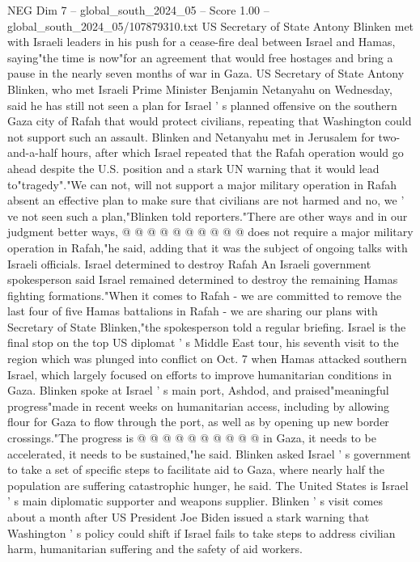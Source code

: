 \begin{textsample}{NEG Dim 7 – global\_south\_2024\_05 – Score 1.00 – global\_south\_2024\_05/107879310.txt}  \label{ex:f7_neg_246}
US Secretary of State Antony Blinken met with Israeli leaders in his push for a cease-fire deal between Israel and Hamas, saying"the time is now"for an agreement that would free hostages and bring a pause in the nearly seven months of war in Gaza.
US Secretary of State Antony Blinken, who met Israeli Prime Minister Benjamin Netanyahu on Wednesday, said he has still not seen a plan for Israel ' s planned offensive on the southern Gaza city of Rafah that would protect civilians, repeating that Washington could not support such an assault.
Blinken and Netanyahu met in Jerusalem for two-and-a-half hours, after which Israel repeated that the Rafah operation would go ahead despite the U.S. position and a stark UN warning that it would lead to"tragedy"."We can not, will not support a major military operation in Rafah absent an effective plan to make sure that civilians are not harmed and no, we ' ve not seen such a plan,"Blinken told reporters."There are other ways and in our judgment better ways, @ @ @ @ @ @ @ @ @ @ does not require a major military operation in Rafah,"he said, adding that it was the subject of ongoing talks with Israeli officials.
Israel determined to destroy Rafah An Israeli government spokesperson said Israel remained determined to destroy the remaining Hamas fighting formations."When it comes to Rafah - we are committed to remove the last four of five Hamas battalions in Rafah - we are sharing our plans with Secretary of State Blinken,"the spokesperson told a regular briefing.
Israel is the final stop on the top US diplomat ' s Middle East tour, his seventh visit to the region which was plunged into conflict on Oct. 7 when Hamas attacked southern Israel, which largely focused on efforts to improve humanitarian conditions in Gaza.
Blinken spoke at Israel ' s main port, Ashdod, and praised"meaningful progress"made in recent weeks on humanitarian access, including by allowing flour for Gaza to flow through the port, as well as by opening up new border crossings."The progress is @ @ @ @ @ @ @ @ @ @ in Gaza, it needs to be accelerated, it needs to be sustained,"he said.
Blinken asked Israel ' s government to take a set of specific steps to facilitate aid to Gaza, where nearly half the population are suffering catastrophic hunger, he said.
The United States is Israel ' s main diplomatic supporter and weapons supplier.
Blinken ' s visit comes about a month after US President Joe Biden issued a stark warning that Washington ' s policy could shift if Israel fails to take steps to address civilian harm, humanitarian suffering and the safety of aid workers.

\end{textsample}
